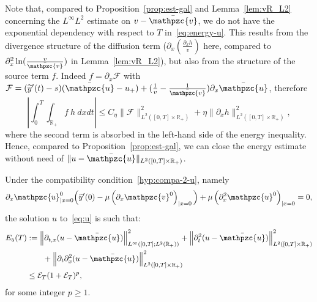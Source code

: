 \documentclass[AHL,Unicode,longabstracts,published]{cedram}
\newcommand{\R}{\mathbb{R}}
\newcommand{\p}{\partial}
\newcommand{\bv}{\bar{\mathpzc{v}}}
\newcommand{\bu}{\bar{\mathpzc{u}}}
\newcommand{\cE}{\mathcal E}
\newcommand{\cF}{\mathcal F}
\newcommand{\tv}{\mathpzc{v}}
\newcommand{\tu}{\mathpzc{u}}
\newcommand{\ty}{\widetilde{y}}
\begin{document}
\begin{rema}
Note that, compared to Proposition~\ref{prop:est-gal} and Lemma~\ref{lem:vR_L2} concerning the $L^\infty L^2$ estimate on $v-\bv$, we do not have the exponential dependency with respect to $T$ in~\eqref{eq:energy-u}. This results from the divergence structure of the diffusion term ($\partial_x (\frac{\partial_xh}{v})$ here, compared to $\partial^2_x \ln (\frac{v}{\bv})$ in Lemma~\ref{lem:vR_L2}), but also from the structure of the source term $f$. Indeed $f= \partial_x \cF$ with $\cF = (\ty'(t)-s)(\bu - u_+) + (\frac{1}{v}-\frac{1}{\bv}) \p_x \bu$, therefore
\[
\left|\int_0^T \int_{\R_+} f \ h \ dx dt \right|
\leq C_\eta \|\cF\|_{L^2([0,T]\times \R_+)}^2 + \eta \|\partial_xh\|_{L^2\left([0,T]\times \R_+\right)}^2,
\]
where the second term is absorbed in the left-hand side of the energy inequality. Hence, compared to Proposition~\ref{prop:est-gal}, we can close the energy estimate without need of $\|u-\bu\|_{L^2([0,T] \times \R_+)}$.
\end{rema}

\begin{lemm}\label{lem:u-2}
Under the compatibility condition~\eqref{hyp:compa-2-u}, namely
\[
\partial_x \tu^0_{|x=0}\Big(\ty'(0) -\mu \left(\partial_x \tv^0\right)_{|x=0} \Big) + \mu \left(\partial^2_x \tu^0\right)_{|x=0} = 0,
\]
the solution $u$ to~\eqref{eq:u} is such that:
\begin{align*}
E_5(T) &:=\left\|\partial_{t,x}(u-\bu)\right\|_{L^\infty\left([0,T]; L^2(\R_+)\right)}^2 + \left\|\partial^2_t(u-\bu)\right\|_{L^2\left([0,T]\times \R_+\right)}^2 \\
&\qquad+ \left\|\partial_t \partial^2_x(u-\bu)\right\|_{L^2\left([0,T]\times \R_+\right)}^2 \nonumber \\
&\leq \cE_T(1+ \cE_T)^p,
\end{align*}
for some integer $p\geq 1$.
\end{lemm}
\end{document}
